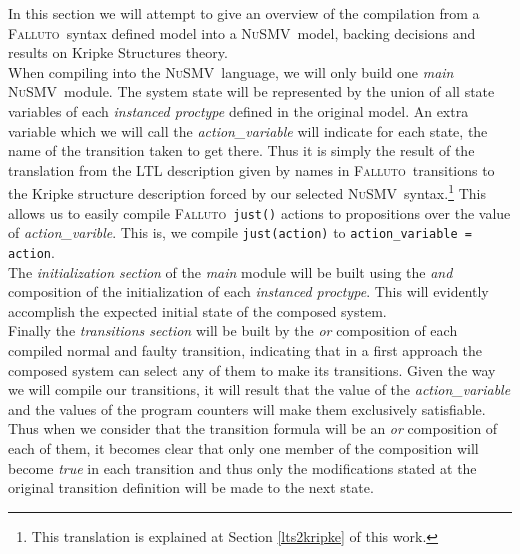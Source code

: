 \documentclass{llncs2e/llncs}
\newcommand{\nusmv}{\mbox{\textsc{NuSMV}}}
\newcommand{\nusmvSp}{\mbox{\textsc{NuSMV~}}}
\newcommand{\fallutoSp}{\nohyphens{\textsc{Falluto~}}}  %
\newcommand{\textfll}[1]{\texttt{#1}}                   %
\newcommand{\textps}[1]{\textit{#1}}                    %
\begin{document}
In this section we will attempt to give an overview of the compilation from a \fallutoSp syntax defined model into a \nusmvSp model, backing decisions and results on Kripke Structures theory.\\
When compiling into the \nusmv~language, we will only build one \textit{main} \nusmv~module. The system state will be represented by the union of all state variables of each \textit{instanced proctype} defined in the original model. An extra variable which we will call the \textit{action\_variable} will indicate for each state, the name of the transition taken to get there. Thus it is simply the result of the translation from the LTL description given by names in \fallutoSp transitions to the Kripke structure description forced by our selected \nusmv~syntax.\footnote{ This translation is explained at Section \ref{lts2kripke} of this work.} This allows us to easily compile \fallutoSp \textfll{just()} actions to propositions over the value of \textit{action\_varible}. This is, we compile \textfll{just(action)} to \textfll{action\_variable = action}.\\
The \textit{initialization section} of the \textit{main} module will be built using the \textit{and} composition of the initialization of each \textit{instanced proctype}. This will evidently accomplish the expected initial state of the composed system.\\
Finally the \textit{transitions section} will be built by the \textit{or} composition of each compiled normal and faulty transition, indicating that in a first approach the composed system can select any of them to make its transitions. Given the way we will compile our transitions, it will result that the value of the \textit{action\_variable} and the values of the program counters will make them exclusively satisfiable. Thus when we consider that the transition formula will be an \textit{or} composition of each of them, it becomes clear that only one member of the composition will become \textps{true} in each transition and thus only the modifications stated at the original transition definition will be made to the next state.
\end{document}
